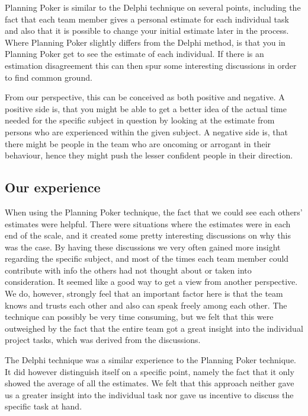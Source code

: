 Planning Poker is similar to the Delphi technique on several points, including the fact that each team member gives a personal estimate for each individual task and also that it is possible to change your initial estimate later in the process. Where Planning Poker slightly differs from the Delphi method, is that you in Planning Poker get to see the estimate of each individual. If there is an estimation disagreement this can then spur some interesting discussions in order to find common ground. 

From our perspective, this can be conceived as both positive and negative. A positive side is, that you might be able to get a better idea of the actual time needed for the specific subject in question by looking at the estimate from persons who are experienced within the given subject. A negative side is, that there might be people in the team who are oncoming or arrogant in their behaviour, hence they might push the lesser confident people in their direction. 

\subsection{Our experience}


When using the Planning Poker technique, the fact that we could see each others' estimates were helpful. There were situations where the estimates were in each end of the scale, and it created some pretty interesting discussions on why this was the case. By having these discussions we very often gained more insight regarding the specific subject, and most of the times each team member could contribute with info the others had not thought about or taken into consideration. It seemed like a good way to get a view from another perspective. We do, however, strongly feel that an important factor here is that the team knows and trusts each other and also can speak freely among each other.
The technique can possibly be very time consuming, but we felt that this were outweighed by the fact that the entire team got a great insight into the individual project tasks, which was derived from the discussions.

The Delphi technique was a similar experience to the Planning Poker technique. It did however distinguish itself on a specific point, namely the fact that it only showed the average of all the estimates. We felt that this approach neither gave us a greater insight into the individual task nor gave us incentive to discuss the specific task at hand.



